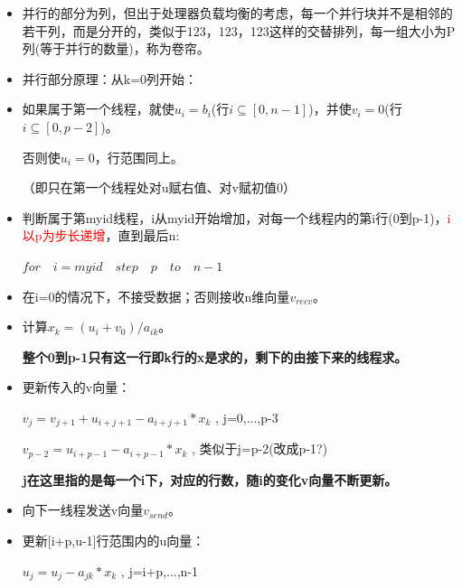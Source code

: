 \documentclass[UTF8]{article}%
\begin{document}
\begin{itemize}
    \item 并行的部分为列，但出于处理器负载均衡的考虑，每一个并行块并不是相邻的若干列，而是分开的，类似于123，123，123这样的交替排列，每一组大小为P列(等于并行的数量)，称为卷帘。
    \item 并行部分原理：从k=0列开始：
    \item 如果属于第一个线程，就使$u_i=b_i$(行$i\subseteq [0,n-1]$)，并使$v_i=0$(行$i\subseteq [0,p-2]$)。
    
    否则使$u_i=0$，行范围同上。
    
    （即只在第一个线程处对u赋右值、对v赋初值0）

    \item 判断属于第myid线程，i从myid开始增加，对每一个线程内的第i行(0到p-1)，\textcolor{red}{i以p为步长递增}，直到最后n:
    
    $for \quad i=myid \quad step \quad p \quad to \quad n-1 $

    \item 在i=0的情况下，不接受数据；否则接收n维向量$v_{recv}$。
    \item 计算$x_k=(u_i+v_0)/a_{ik}$。
    
    \textbf{整个0到p-1只有这一行即k行的x是求的，剩下的由接下来的线程求。}

    \item 更新传入的v向量：
    
    $v_j=v_{j+1}+u_{i+j+1}-a_{i+j+1}*x_k$ , j=0,...,p-3

    $v_{p-2}=u_{i+p-1}-a_{i+p-1}*x_k$ , 类似于j=p-2(改成p-1?)

    \textbf{j在这里指的是每一个i下，对应的行数，随i的变化v向量不断更新。}

    \item 向下一线程发送v向量$v_{send}$。
    \item 更新[i+p,u-1]行范围内的u向量：
    
    $u_j=u_j-a_{jk}*x_k$ , j=i+p,...,n-1


\end{itemize}
\end{document}
